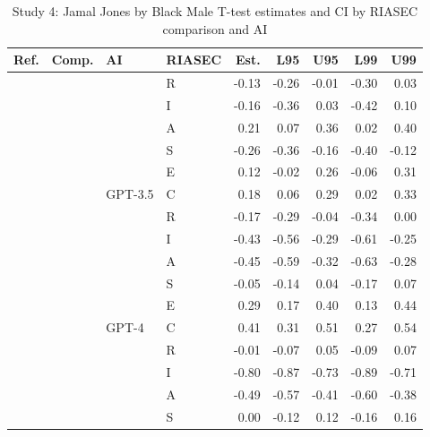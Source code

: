 \begin{table}

\caption{Study 4: Jamal Jones by Black Male T-test estimates and CI by RIASEC comparison and AI}
\centering
\fontsize{8}{10}\selectfont
\begin{tabular}[t]{llllrrrrr}
\toprule
Ref. & Comp. & AI & RIASEC & Est. & L95 & U95 & L99 & U99\\
\midrule
 &  &  & R & -0.13 & -0.26 & -0.01 & -0.30 & 0.03\\

 &  &  & I & -0.16 & -0.36 & 0.03 & -0.42 & 0.10\\

 &  &  & A & 0.21 & 0.07 & 0.36 & 0.02 & 0.40\\

 &  &  & S & -0.26 & -0.36 & -0.16 & -0.40 & -0.12\\

 &  &  & E & 0.12 & -0.02 & 0.26 & -0.06 & 0.31\\

 &  & \multirow[t]{-6}{*}{\raggedright\arraybackslash GPT-3.5} & C & 0.18 & 0.06 & 0.29 & 0.02 & 0.33\\

 &  &  & R & -0.17 & -0.29 & -0.04 & -0.34 & 0.00\\

 &  &  & I & -0.43 & -0.56 & -0.29 & -0.61 & -0.25\\

 &  &  & A & -0.45 & -0.59 & -0.32 & -0.63 & -0.28\\

 &  &  & S & -0.05 & -0.14 & 0.04 & -0.17 & 0.07\\

 &  &  & E & 0.29 & 0.17 & 0.40 & 0.13 & 0.44\\

 &  & \multirow[t]{-6}{*}{\raggedright\arraybackslash GPT-4} & C & 0.41 & 0.31 & 0.51 & 0.27 & 0.54\\

 &  &  & R & -0.01 & -0.07 & 0.05 & -0.09 & 0.07\\

 &  &  & I & -0.80 & -0.87 & -0.73 & -0.89 & -0.71\\

 &  &  & A & -0.49 & -0.57 & -0.41 & -0.60 & -0.38\\

 &  &  & S & 0.00 & -0.12 & 0.12 & -0.16 & 0.16\\


\end{tabular}
\end{table}
